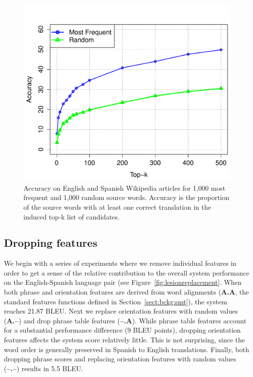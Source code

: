 \documentclass[11pt]{article}
\newcommand{\secref}[1]{Section~\ref{#1}}
\newcommand{\figref}[1]{Figure~\ref{#1}}
\begin{document}
\begin{figure}[t]
\begin{center}
\includegraphics[width=\linewidth]{../figures/lexinduct/lexinduct.pdf}
\caption{Accuracy on English and Spanish Wikipedia articles for 1,000 most frequent and 1,000 random source words.  Accuracy is the proportion of the source words with at least one correct translation in the induced top-k list of candidates.}
\label{fig:lexinduct}
\end{center}
\vskip -0.2in
\end{figure}

\subsection{Dropping features}  \label{sect:exp:lesions}

We begin with a series of experiments where we remove individual features in order to get a sense of the relative contribution to the overall system performance on the English-Spanish language pair (see \figref{fig:lesionreplacement}.  When both phrase and orientation features are derived from word alignments ({\bf A.A}, the standard features functions defined in \secref{sect:bckg:smt}), the system reaches 21.87 BLEU.  Next we replace orientation features with random values ({\bf A.--}) and drop phrase table features ({\bf --.A}).  While phrase table features account for a substantial performance difference (9 BLEU points), dropping orientation features affects the system score relatively little.  This is not surprising, since the word order is generally preserved in Spanish to English translations.  Finally, both dropping phrase scores and replacing orientation features with random values ({\bf --.--}) results in 5.5 BLEU.
\end{document}
